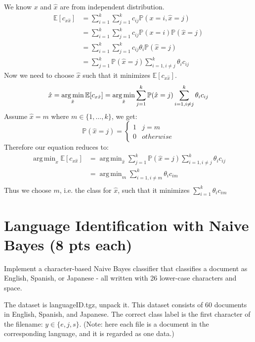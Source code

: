 \documentclass[a4paper]{article}
\theoremstyle{definition}
\DeclareMathOperator*{\argmin}{arg\,min}
\def\E{\mathbb E}
\newenvironment{soln}{
    \leavevmode\color{blue}\ignorespaces
}{}
\begin{document}
\begin{soln}
    We know $x$ and $\hat x$ are from independent distribution.
    \begin{align*}
        \E[c_{x \hat x}] &= \sum_{i=1}^{k}\sum_{j=1}^{k}c_{ij}\mathbb P(x=i,\hat x=j) \\
        &= \sum_{i=1}^{k}\sum_{j=1}^{k}c_{ij}\mathbb P(x=i)\mathbb P(\hat x=j)\\
        &= \sum_{i=1}^{k}\sum_{j=1}^{k}c_{ij}\theta_i\mathbb P(\hat x=j)\\
        &= \sum_{j=1}^{k}\mathbb P(\hat x=j)\sum_{i=1,i\neq j}^{k}\theta_i c_{ij}
    \end{align*}
    Now we need to choose $\hat x$ such that it minimizes $\E[c_{x \hat x}]$.
    $$
        \hat x = \argmin_{\hat x}\E[c_{x \hat x}] = \argmin_{\hat x}\sum_{j=1}^{k}\mathbb P(\hat x=j)\sum_{i=1,i\neq j}^{k}\theta_i c_{ij} \\
    $$
    Assume $\hat x=m$ where $m \in \{1, \ldots, k\}$, we get:
    $$
        \mathbb P(\hat x=j) = \begin{cases}1 & j=m\\ 0 & otherwise \end{cases}
    $$
    Therefore our equation reduces to:
    \begin{align*}
        \argmin_{\hat x}\E[c_{x \hat x}] &= \argmin_{\hat x}\sum_{j=1}^{k}\mathbb P(\hat x=j)\sum_{i=1,i\neq j}^{k}\theta_i c_{ij} \\
        &= \argmin_{m}\sum_{i=1,i\neq m}^{k}\theta_i c_{im} \\
    \end{align*}
    Thus we choose $m$, i.e. the class for $\hat x$, such that it minimizes $\sum_{i=1}^{k}\theta_i c_{im}$
\end{soln}

\section{Language Identification with Naive Bayes (8 pts each)}
Implement a character-based Naive Bayes classifier that classifies a document as English, Spanish, or Japanese - all written with 26 lower-case characters and space.

The dataset is languageID.tgz, unpack it. This dataset consists of 60 documents in English, Spanish, and Japanese. The correct class label is the first character of the filename: $y \in \{e, j, s\}$. (Note: here each file is a document in the corresponding language, and it is regarded as one data.)
\end{document}
